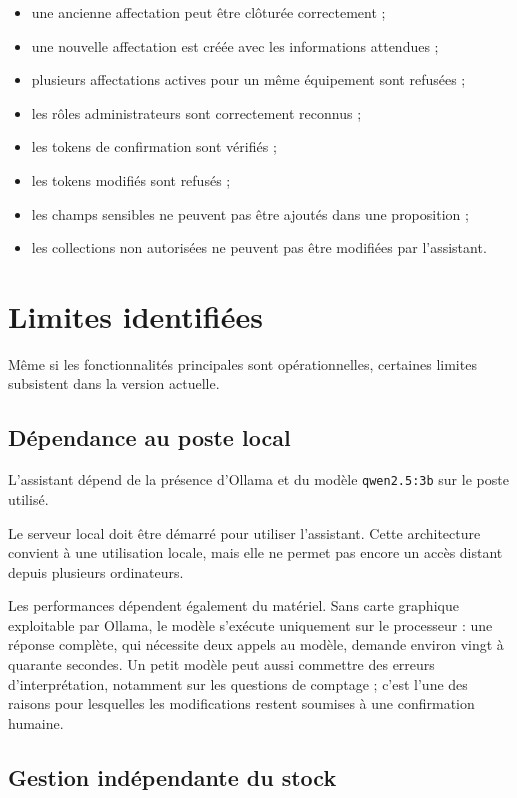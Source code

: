\documentclass{rapportENSIAS}
\begin{document}
\begin{itemize}
    \item une ancienne affectation peut être clôturée correctement ;
    \item une nouvelle affectation est créée avec les informations attendues ;
    \item plusieurs affectations actives pour un même équipement sont refusées ;
    \item les rôles administrateurs sont correctement reconnus ;
    \item les tokens de confirmation sont vérifiés ;
    \item les tokens modifiés sont refusés ;
    \item les champs sensibles ne peuvent pas être ajoutés dans une proposition ;
    \item les collections non autorisées ne peuvent pas être modifiées par l’assistant.
\end{itemize}

\section{Limites identifiées}

Même si les fonctionnalités principales sont opérationnelles, certaines limites subsistent dans la version actuelle.

\subsection{Dépendance au poste local}

L’assistant dépend de la présence d’Ollama et du modèle \texttt{qwen2.5:3b} sur le poste utilisé.

Le serveur local doit être démarré pour utiliser l’assistant. Cette architecture convient à une utilisation locale, mais elle ne permet pas encore un accès distant depuis plusieurs ordinateurs.

Les performances dépendent également du matériel. Sans carte graphique exploitable par Ollama, le modèle s’exécute uniquement sur le processeur : une réponse complète, qui nécessite deux appels au modèle, demande environ vingt à quarante secondes. Un petit modèle peut aussi commettre des erreurs d’interprétation, notamment sur les questions de comptage ; c’est l’une des raisons pour lesquelles les modifications restent soumises à une confirmation humaine.

\subsection{Gestion indépendante du stock}
\end{document}
